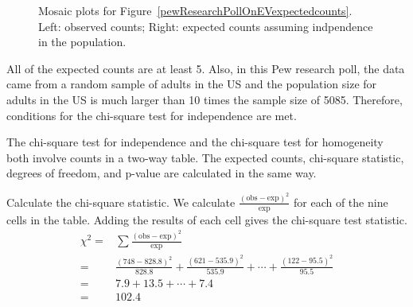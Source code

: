 
\begin{figure}[h]
\caption{Mosaic plots for Figure~\ref{pewResearchPollOnEVexpectedcounts}.  Left: observed counts; Right: expected counts assuming indpendence in the population.}
\label{pewEVmosaicplots}
\end{figure}

All of the expected counts are at least 5.  Also, in this Pew research poll, the data came from a random sample of adults in the US and the population size for adults in the US is much larger than 10 times the sample size of 5085.  Therefore, conditions for the chi-square test for independence are met.

\D{\newpage}

The chi-square test for independence and the chi-square test for homogeneity both involve counts in a two-way table.  The expected counts, chi-square statistic, degrees of freedom, and p-value are calculated in the same way.  

\begin{examplewrap}
\begin{nexample}{Calculate the chi-square statistic.}
We calculate $\frac{(\text{obs} - \text{exp})^2}{\text{exp}}$ for each of the nine cells in the table. Adding the results of each cell gives the chi-square test statistic.
\begin{align*}
\chi^2 =& \sum{\frac{(\text{obs} - \text{exp})^2}{\text{exp}}}\\
=& \frac{(748-828.8)^2}{828.8} +  \frac{(621-535.9)^2}{535.9} +  \cdots + \frac{(122-95.5)^2}{95.5} \\
=& 7.9 + 13.5 + \cdots + 7.4  \\
=& 102.4
\end{align*}
\end{nexample}
\end{examplewrap}

